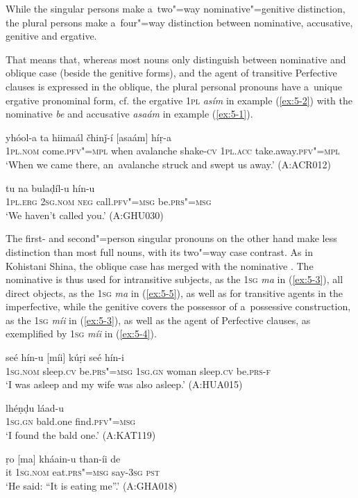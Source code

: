 While the singular persons make a~two"=way nominative"=genitive distinction, the plural persons make a~four"=way distinction between nominative, accusative, genitive and ergative.


That means that, whereas most nouns only distinguish between nominative and oblique case (beside the genitive forms), and the agent of transitive Perfective clauses is expressed in the oblique, the plural personal pronouns have a~unique ergative pronominal form, cf. the ergative \textsc{1pl} \textit{asím} in example (\ref{ex:5-2}) with the nominative \textit{be} and accusative \textit{asaám} in example (\ref{ex:5-1}). 

\begin{exe}
\ex
\label{ex:5-1}
\gll [be] yhóol-a ta hiimaál čhinǰ-í [asaám] híṛ-a \\
\textsc{1pl.nom} come.\textsc{pfv"=mpl} when avalanche shake\textsc{-cv} \textsc{1pl.acc} take.away.\textsc{pfv"=mpl} \\
\glt `When we came there, an~avalanche struck and swept us away.' (A:ACR012)

\ex
\label{ex:5-2}
\gll [asím] tu na bulaḍíl-u hín-u \\
	\textsc{1pl.erg} \textsc{2sg.nom} \textsc{neg} call.\textsc{pfv"=msg} be.\textsc{prs"=msg} \\
\glt `We haven't called you.' (A:GHU030)
\end{exe}

The first- and second"=person singular pronouns on the other hand make less distinction than most full nouns, with its two"=way case contrast. As in Kohistani Shina, the oblique case has merged with the nominative \citep[82]{schmidtkohistani2008}. The nominative is thus used for intransitive subjects, as the \textsc{1sg} \textit{ma} in (\ref{ex:5-3}), all direct objects, as the \textsc{1sg} \textit{ma} in (\ref{ex:5-5}), as well as for transitive agents in the imperfective, while the genitive covers the possessor of a~possessive construction, as the \textsc{1sg} \textit{míi} in (\ref{ex:5-3}), as well as the agent of Perfective clauses, as exemplified by \textsc{1sg} \textit{míi} in (\ref{ex:5-4}). 


\begin{exe}
\ex
\label{ex:5-3}
\gll [ma] seé hín-u [míi] kúṛi seé hín-i \\
	\textsc{1sg.nom} sleep.\textsc{cv} be.\textsc{prs"=msg} \textsc{1sg.gn} woman sleep.\textsc{cv} be.\textsc{prs-f} \\
\glt `I was asleep and my wife was also asleep.' (A:HUA015)

\ex
\label{ex:5-4}
\gll [míi] lhéṇḍu láad-u \\
	\textsc{1sg.gn} bald.one find.\textsc{pfv"=msg} \\
\glt `I found the bald one.' (A:KAT119)

\ex
\label{ex:5-5}
\gll ṛo [ma] kháain-u than-íi de \\
	it \textsc{1sg.nom} eat.\textsc{prs"=msg} say-\textsc{3sg} \textsc{pst} \\
\glt `He said: ``It is eating me''.' (A:GHA018)
\end{exe}

